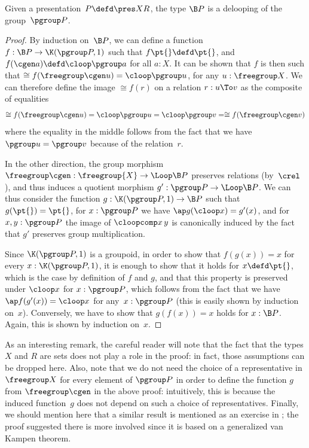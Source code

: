 \begin{theorem}
  \label{presented-delooping}
  Given a presentation~$P\defd\pres XR$, the type $\B P$ is a delooping of the group~$\pgroup P$.
\end{theorem}
\begin{proof}
  By induction on~$\B P$, we can define a function $f:\B P\to\K(\pgroup P,1)$ such that
  $f\pt{}\defd\pt{}$, and $f(\cgen a)\defd\cloop\pgroup a$ for all $a:X$. It can
  be shown that $f$ is then such that
  $\cong f(\freegroup\cgen u)=\cloop\pgroup u$, for any $u:\freegroup X$. We can
  therefore define the image $\cong f(r)$ on a relation $r:u\To v$ as the
  composite of equalities
  \[
    \cong f(\freegroup\cgen u)=\cloop\pgroup u=\cloop\pgroup v=\cong f(\freegroup\cgen v)
  \]
  where the equality in the middle follows from the fact that we have
  $\pgroup u=\pgroup v$ because of the relation~$r$.

  In the other direction, the group morphism $\freegroup\cgen:\freegroup{X}\to \Loop\B P$ preserves relations (by~$\crel$), and thus induces a quotient morphism $g':\pgroup P\to\Loop\B P$.
  We can thus consider the function $g:\K(\pgroup P,1)\to\B P$ such that $g(\pt{})=\pt{}$, for $x:\pgroup P$ we have $\ap g(\cloop x)=g'(x)$, and for $x,y:\pgroup P$ the image of $\cloopcomp x\,y$ is canonically induced by the fact that $g'$ preserves group multiplication.

  Since $\K(\pgroup P,1)$ is a groupoid, in order to show that $f(g(x))=x$ for every $x:\K(\pgroup P,1)$, it is enough to show that it holds for $x\defd\pt{}$, which is the case by definition of $f$ and $g$, and that this property is preserved under $\cloop x$ for $x:\pgroup P$, which follows from the fact that we have $\ap f(g'(x))=\cloop x$ for any~$x:\pgroup P$ (this is easily shown by induction on~$x$).
  Conversely, we have to show that $g(f(x))=x$ holds for $x:\B P$. Again, this is shown by induction on~$x$.
\end{proof}

\noindent
As an interesting remark, the careful reader will note that the fact that the types $X$ and $R$ are sets does not play a role in the proof: in fact, those assumptions can be dropped here.
%
Also, note that we do not need the choice of a representative in $\freegroup X$ for every element of $\pgroup P$ in order to define the function $g$ from $\freegroup\cgen$ in the above proof: intuitively, this is because the induced function~$g$ does not depend on such a choice of representatives.
%
Finally, we should mention here that a similar result is mentioned as an exercise in \cite[Example 8.7.17]{hottbook}; the proof suggested there is more involved since it is based on a generalized van Kampen theorem.

